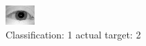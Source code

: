 \begin{figure}[h!]
\begin{center}
\includegraphics[width=0.60\columnwidth]{figures/ID993_class_1_target_2.png}
\end{center}
\caption{ Classification: 1 actual target: 2}
\label{fig:ID993_class_1_target_2}
\end{figure}
